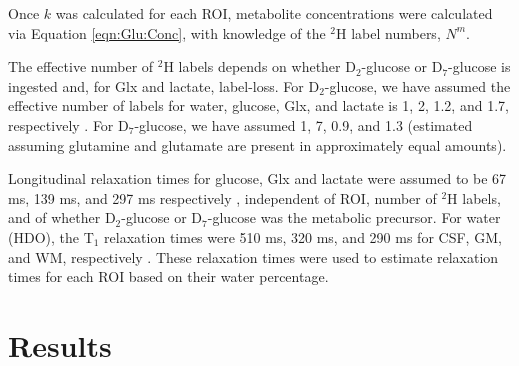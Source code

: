 Once $k$ was calculated for each \ac{ROI}, metabolite concentrations were calculated via Equation \ref{eqn:Glu:Conc}, with knowledge of the $^2$H label numbers, $N^m$.

The effective number of $^2$H labels depends on whether D$_2$-glucose or D$_7$-glucose is ingested and, for Glx and lactate, label-loss. For D$_2$-glucose, we have assumed the effective number of labels for water, glucose, Glx, and lactate is 1, 2, 1.2, and 1.7, respectively \cite{DeGraaf2021CharacterizationStudies}. For D$_7$-glucose, we have assumed 1, 7, 0.9, and 1.3 (estimated \cite{Funk2017TheGlucose} assuming glutamine and glutamate are present in approximately equal amounts). 

Longitudinal relaxation times for glucose, Glx and lactate were assumed to be 67 ms, 139 ms, and 297 ms respectively \cite{DeFeyter2018DeuteriumVivo}, independent of \ac{ROI}, number of $^2$H labels, and of whether D$_2$-glucose or D$_7$-glucose was the metabolic precursor. For water (\ac{HDO}), the T$_1$ relaxation times were 510 ms, 320 ms, and 290 ms for \ac{CSF}, \ac{GM}, and \ac{WM}, respectively \cite{Cocking2023DeuteriumDosing}. These relaxation times were used to estimate relaxation times for each \ac{ROI} based on their water percentage.

\section{Results}


